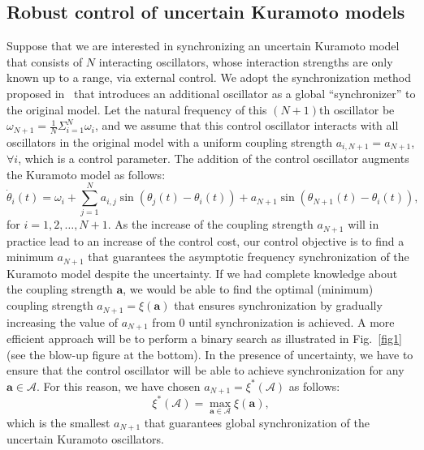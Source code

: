 \documentclass{article}
\begin{document}
\subsection{Robust control of uncertain Kuramoto models}
\label{robustControlOfUncertainKuramotoModels}
Suppose that we are interested in synchronizing an uncertain Kuramoto model that consists of $N$ interacting oscillators, whose interaction strengths are only known up to a range, via external control. We adopt the synchronization method proposed in~\cite{Hong2021} that introduces an additional oscillator as a global ``synchronizer'' to the original model. Let the natural frequency of this $\left(N+1\right)$th oscillator be ${\omega_{N+1}}=\frac{1}{N}\Sigma_{i=1}^N {\omega_i}$, and we assume that this control oscillator interacts with all oscillators in the original model with a uniform coupling strength $a_{i,N+1} = {a_{N+1}}$, $\forall i$, which is a control parameter. The addition of the control oscillator augments the Kuramoto model as follows:
\begin{equation}\label{kuramotoModelUnderControl}
\dot \theta_i(t) = \omega_i + \sum_{j=1}^{N} a_{i,j} \sin (\theta_j(t)- \theta_i(t)) + a_{N+1} \sin (\theta_{N+1}(t)- \theta_i(t)),
\end{equation}
for ${i=1,2,\dots,N+1}$. As the increase of the coupling strength ${a_{N+1}}$ will in practice lead to an increase of the control cost, our control objective is to find a minimum ${a_{N+1}}$ that guarantees the asymptotic frequency synchronization of the Kuramoto model despite the uncertainty. If we had complete knowledge about the coupling strength ${\mathbf{a}}$, we would be able to find the optimal (minimum) coupling strength $a_{N+1} = {\xi\left(\mathbf{a}\right)}$ that ensures synchronization by gradually increasing the value of $a_{N+1}$ from $0$ until synchronization is achieved. A more efficient approach will be to perform a binary search as illustrated in Fig.~\ref{fig1} (see the blow-up figure at the bottom). In the presence of uncertainty, we have to ensure that the control oscillator will be able to achieve synchronization for any $\mathbf{a} \in {\mathbf{\mathcal{A}}}$. For this reason, we have chosen $a_{N+1} = {\xi^\ast\left(\mathbf{\mathcal{A}}\right)}$ as follows:
\begin{equation}
\xi^\ast\left(\mathbf{\mathcal{A}}\right)=\max_{\mathbf{a}\in\mathbf{\mathcal{A}}} \xi\left(\mathbf{a}\right),    \label{eq:robust}
\end{equation}
which is the smallest $a_{N+1}$ that guarantees global synchronization of the uncertain Kuramoto oscillators.
\end{document}
